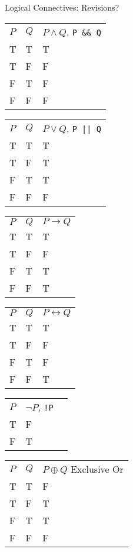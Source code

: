\documentclass{beamer}
\begin{document}
\begin{frame}[fragile]{Logical Connectives: Revisions?}
  \begin{tabular}{|l|l|l|}
    \hline
   $P$ & $Q$ & $P \land Q$, \verb+P && Q+ \\
    T  & T   & T \\
    T  & F   & F \\
    F  & T   & F \\
    F  & F   & F \\
    \hline
  \end{tabular}
  \begin{tabular}{|l|l|l|}
    \hline
   $P$ & $Q$ & $P \lor Q$, \verb+P || Q+ \\
    T  & T   & T \\
    T  & F   & T \\
    F  & T   & T \\
    F  & F   & F \\
    \hline
  \end{tabular}

  \begin{tabular}{|l|l|l|}
    \hline
   $P$ & $Q$ & $P \rightarrow Q$ \\
    T  & T   & T \\
    T  & F   & F \\
    F  & T   & T \\
    F  & F   & T \\
    \hline
  \end{tabular}
  \begin{tabular}{|l|l|l|}
    \hline
   $P$ & $Q$ & $P \leftrightarrow Q$ \\
    T  & T   & T \\
    T  & F   & F \\
    F  & T   & F \\
    F  & F   & T \\
    \hline
  \end{tabular}
  \begin{tabular}{|l|l|l|}
    \hline
   $P$ & $\neg P$, \verb+!P+ \\
    T  & F \\
    F  & T \\
    \hline
  \end{tabular}

  \begin{tabular}{|l|l|l|}
    \hline
   $P$ & $Q$ & $P \oplus Q$ Exclusive Or \\
    T  & T   & F \\
    T  & F   & T \\
    F  & T   & T \\
    F  & F   & F \\
    \hline
  \end{tabular}
\end{frame}
\end{document}
